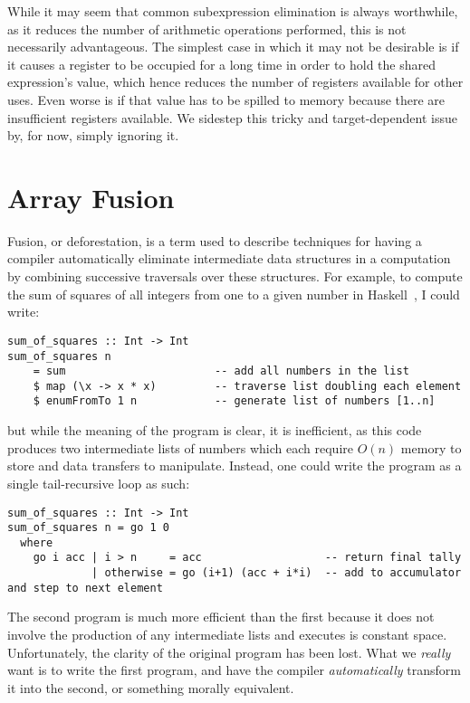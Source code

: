 While it may seem that common subexpression elimination is always worthwhile, as
it reduces the number of arithmetic operations performed, this is not
necessarily advantageous. The simplest case in which it may not be desirable is
if it causes a register to be occupied for a long time in order to hold the
shared expression's value, which hence reduces the number of registers available
for other uses. Even worse is if that value has to be spilled to memory because
there are insufficient registers available. We sidestep this tricky and
target-dependent issue by, for now, simply ignoring it.


\section{Array Fusion}
\label{sec:fusion}

Fusion, or deforestation, is a term used to describe techniques for having a
compiler automatically eliminate intermediate data structures in a computation
by combining successive traversals over these structures. For example, to
compute the sum of squares of all integers from one to a given number in
Haskell~\cite{Haskell:1998}, I could write:
%
\begin{lstlisting}[style=haskell]
sum_of_squares :: Int -> Int
sum_of_squares n
    = sum                       -- add all numbers in the list
    $ map (\x -> x * x)         -- traverse list doubling each element
    $ enumFromTo 1 n            -- generate list of numbers [1..n]
\end{lstlisting}
%
but while the meaning of the program is clear, it is inefficient, as this code
produces two intermediate lists of numbers which each require $O(n)$ memory to
store and data transfers to manipulate. Instead, one could write the program
as a single tail-recursive loop as such:
%
\begin{lstlisting}[style=haskell]
sum_of_squares :: Int -> Int
sum_of_squares n = go 1 0
  where
    go i acc | i > n     = acc                   -- return final tally
             | otherwise = go (i+1) (acc + i*i)  -- add to accumulator and step to next element
\end{lstlisting}
%
The second program is much more efficient than the first because it does not
involve the production of any intermediate lists and executes is constant space.
Unfortunately, the clarity of the original program has been lost. What we
\emph{really} want is to write the first program, and have the compiler
\emph{automatically} transform it into the second, or something morally
equivalent.

